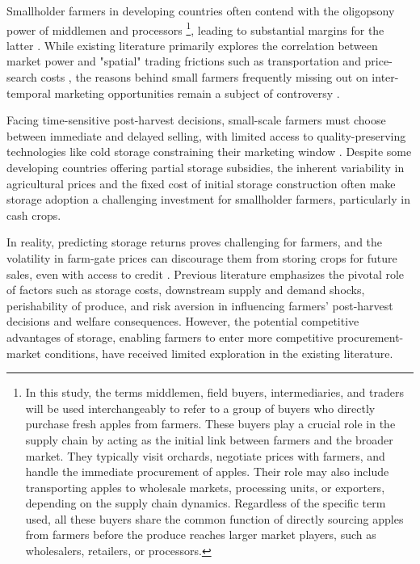 Smallholder farmers in developing countries often contend with the oligopsony power of middlemen and processors \footnote{In this study, the terms middlemen, field buyers, intermediaries, and traders will be used interchangeably to refer to a group of buyers who directly purchase fresh apples from farmers. These buyers play a crucial role in the supply chain by acting as the initial link between farmers and the broader market. They typically visit orchards, negotiate prices with farmers, and handle the immediate procurement of apples. Their role may also include transporting apples to wholesale markets, processing units, or exporters, depending on the supply chain dynamics. Regardless of the specific term used, all these buyers share the common function of directly sourcing apples from farmers before the produce reaches larger market players, such as wholesalers, retailers, or processors.}, leading to substantial margins for the latter \citep{rogers_rich_1994assessing}. While existing literature primarily explores the correlation between market power and "spatial" trading frictions such as transportation and price-search costs \citep{bergquist_dinerstein_2020,mitra_mookherjee_torero_visaria_2018,ranjan_2017,antras_costinot_2011}, the reasons behind small farmers frequently missing out on inter-temporal marketing opportunities remain a subject of controversy \citep{williams1991storage, wright1984welfare, ruhinduka2020smallholder, lai2003optimal}.

Facing time-sensitive post-harvest decisions, small-scale farmers must choose between immediate and delayed selling, with limited access to quality-preserving technologies like cold storage constraining their marketing window \citep{aggarwal2018grain}. Despite some developing countries offering partial storage subsidies, the inherent variability in agricultural prices and the fixed cost of initial storage construction often make storage adoption a challenging investment for smallholder farmers, particularly in cash crops.

In reality, predicting storage returns proves challenging for farmers, and the volatility in farm-gate prices can discourage them from storing crops for future sales, even with access to credit \citep{cardell2023price}. Previous literature emphasizes the pivotal role of factors such as storage costs, downstream supply and demand shocks, perishability of produce, and risk aversion in influencing farmers' post-harvest decisions and welfare consequences. However, the potential competitive advantages of storage, enabling farmers to enter more competitive procurement-market conditions, have received limited exploration in the existing literature.


